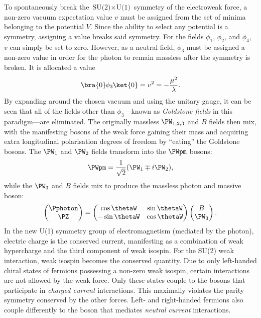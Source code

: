 To spontaneously break the $\text{SU(2)} \times \text{U(1)}$ symmetry of the electroweak force, a non-zero vacuum expectation value $v$ must be assigned from the set of minima belonging to the potential $V$. Since the ability to select any potential is a symmetry, assigning a value breaks said symmetry. For the fields $\phi_1$, $\phi_2$, and $\phi_4$, $v$ can simply be set to zero. However, as a neutral field, $\phi_3$ must be assigned a non-zero value in order for the photon to remain massless after the symmetry is broken. It is allocated a value
\begin{equation}
    \bra{0} \mkern-1mu \phi_3 \mkern-1mu \ket{0} = v^2 = -\frac{\mu^2}{\lambda}.
    \label{eq:higgs_vev}
\end{equation}
By expanding \HiggsField around the chosen vacuum and using the unitary gauge, it can be seen that all of the fields other than $\phi_3$---known as \emph{Goldstone fields} in this paradigm---are eliminated. The originally massless $\PW_{1,2,3}$ and $B$ fields then mix, with the manifesting bosons of the weak force gaining their mass and acquiring extra longitudinal polarisation degrees of freedom by ``eating'' the Goldstone bosons. The $\PW_1$ and $\PW_2$ fields transform into the $\PWpm$ bosons:
\begin{equation}
    \PWpm = \frac{1}{\sqrt{2}} (\PW_1 \mp i\PW_2),
    \label{eq:EWSB_W}
\end{equation}
while the $\PW_3$ and $B$ fields mix to produce the massless photon and massive \PZ boson:
\begin{equation}
    \begin{pmatrix} \Pphoton \\ \PZ \end{pmatrix} = \begin{pmatrix} \cos\thetaW & \sin\thetaW \\ -\sin\thetaW & \cos\thetaW \end{pmatrix} \begin{pmatrix} B \\ \PW_3 \end{pmatrix}.
    \label{eq:EWSB_photon_Z}
\end{equation}
In the new U(1) symmetry group of electromagnetism (mediated by the photon), electric charge is the conserved current, manifesting as a combination of weak hypercharge and the third component of weak isospin. For the SU(2) weak interaction, weak isospin becomes the conserved quantity. Due to only left-handed chiral states of fermions possessing a non-zero weak isospin, certain interactions are not allowed by the weak force. Only these states couple to the \PW bosons that participate in \emph{charged current} interactions. This maximally violates the parity symmetry conserved by the other forces. Left- and right-handed fermions also couple differently to the \PZ boson that mediates \emph{neutral current} interactions.

